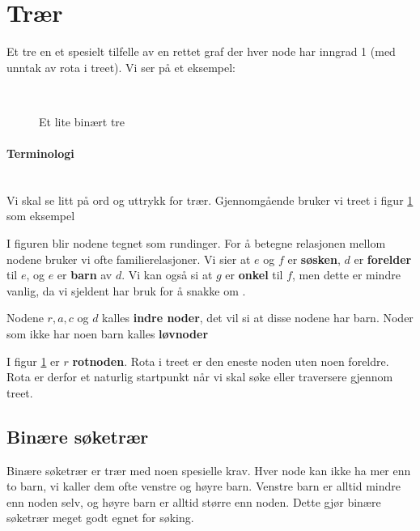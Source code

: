 

\section{Trær}
Et tre en et spesielt tilfelle av en rettet graf der hver node har inngrad 1 (med unntak av rota i treet). Vi ser på et eksempel:
\begin{figure}[H]
\caption{Et lite binært tre}
\label{fig:tre}
\centering
~\\
\end{figure}

\paragraph{Terminologi}~\\
Vi skal se litt på ord og uttrykk for trær. Gjennomgående bruker vi treet i figur \ref{fig:tre} som eksempel

I figuren blir nodene tegnet som rundinger. For å betegne relasjonen mellom nodene bruker vi ofte familierelasjoner. Vi sier at $ e $ og $ f $ er \textbf{søsken}, $ d $ er \textbf{forelder} til $ e $, og $ e $ er \textbf{barn} av $ d $. Vi kan også si at $ g $ er \textbf{onkel} til $ f $, men dette er mindre vanlig, da vi sjeldent har bruk for å snakke om . 

Nodene $ r, a, c $ og $ d $ kalles \textbf{indre noder}, det vil si at disse nodene har barn. Noder som ikke har noen barn kalles \textbf{løvnoder}

I figur \ref{fig:tre} er $ r $ \textbf{rotnoden}. Rota i treet er den eneste noden uten noen foreldre. Rota er derfor et naturlig startpunkt når vi skal søke eller traversere gjennom treet. 


\subsection{Binære søketrær}
\label{bintraer}
Binære søketrær er trær med noen spesielle krav. Hver node kan ikke ha mer enn to barn, vi kaller dem ofte venstre og høyre barn. Venstre barn er alltid mindre enn noden selv, og høyre barn er alltid større enn noden. Dette gjør binære søketrær meget godt egnet for søking. 

